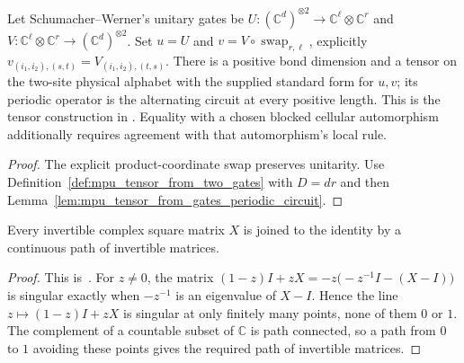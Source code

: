 \begin{lemma}
    \label{lem:mpu_tensor_from_margolus_gates}
    \leanok
    Let Schumacher--Werner's unitary gates be
    $U:(\mathbb C^d)^{\otimes2}\to\mathbb C^\ell\otimes\mathbb C^r$ and
    $V:\mathbb C^\ell\otimes\mathbb C^r\to(\mathbb C^d)^{\otimes2}$.
    Set $u=U$ and $v=V\circ\operatorname{swap}_{r,\ell}$, explicitly
    $v_{(i_1,i_2),(s,t)}=V_{(i_1,i_2),(t,s)}$.
    There is a positive bond dimension and a tensor on the two-site
    physical alphabet with the supplied standard form for $u,v$; its
    periodic operator is the alternating circuit at every positive length.
    This is the tensor construction in
    \cite[Appendix, line~2308]{Cirac2017MPU}. Equality with a chosen blocked
    cellular automorphism additionally requires agreement with that
    automorphism's local rule.
\end{lemma}
\begin{proof}
    \leanok
    The explicit product-coordinate swap preserves unitarity. Use
    Definition~\ref{def:mpu_tensor_from_two_gates} with $D=dr$ and then
    Lemma~\ref{lem:mpu_tensor_from_gates_periodic_circuit}.
\end{proof}

\begin{lemma}
    \label{lem:invertible_matrices_joined}
    \leanok
    Every invertible complex square matrix $X$ is joined to the identity by a
    continuous path of invertible matrices.
\end{lemma}
\begin{proof}
    \leanok
    This is~\cite[``Paths of invertible matrices'']{QICLean2026Blueprint}.
    For $z\neq0$, the matrix $(1-z)I+zX=-z\bigl(-z^{-1}I-(X-I)\bigr)$ is
    singular exactly when $-z^{-1}$ is an eigenvalue of $X-I$. Hence the
    line $z\mapsto(1-z)I+zX$ is singular at only finitely many points, none of
    them $0$ or $1$. The complement of a countable subset of $\mathbb C$ is
    path connected, so a path from $0$ to $1$ avoiding these points gives the
    required path of invertible matrices.
\end{proof}

